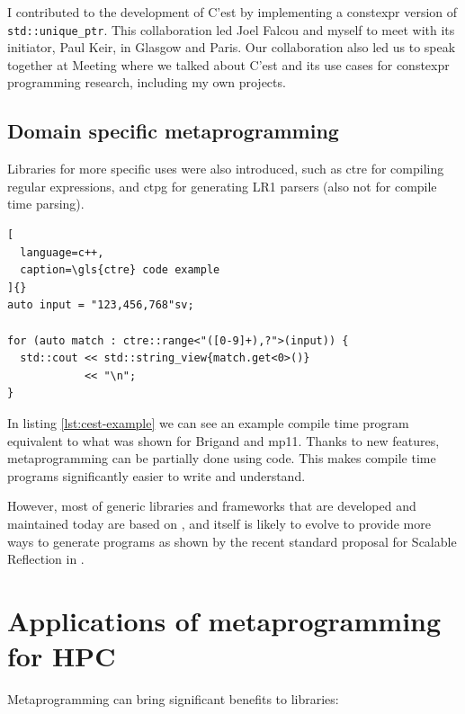 \documentclass[../main]{subfiles}
\begin{document}
I contributed to the development of C'est by implementing a \gls{constexpr}
version of \lstinline{std::unique_ptr}. This collaboration led Joel Falcou
and myself to meet with its initiator, Paul Keir, in Glasgow and Paris.
Our collaboration also led us to speak together at
Meeting  \cite{meetingcpp22} where we talked about C'est and
its use cases for \gls{constexpr} programming research,
including my own projects.

\subsection{
  Domain specific metaprogramming
}

Libraries for more specific uses were also introduced, such as
\gls{ctre} \cite{ctre} for compiling regular expressions,
and \gls{ctpg} \cite{ctpg} for generating LR1 parsers
(also not for compile time parsing).

\begin{lstlisting}[
  language=c++,
  caption=\gls{ctre} code example
]{}
auto input = "123,456,768"sv;

for (auto match : ctre::range<"([0-9]+),?">(input)) {
  std::cout << std::string_view{match.get<0>()}
            << "\n";
}
\end{lstlisting}

In listing \ref{lst:cest-example} we can see an example compile time program
equivalent to what was shown for Brigand and mp11. Thanks to new \cpp features,
metaprogramming can be partially done using \cpp code. This makes
compile time programs significantly easier to write and understand.

However, most of generic libraries and frameworks that are developed
and maintained today are based on \cpp, and \cpp itself is likely to
evolve to provide more ways to generate programs as shown by the recent
standard proposal for Scalable Reflection in \cpp \cite{scalable-reflection}.

\section{
  Applications of metaprogramming for HPC
}

Metaprogramming can bring significant benefits to libraries:
\end{document}

